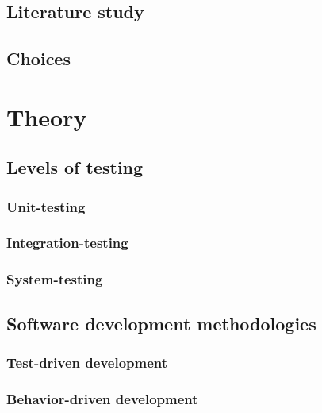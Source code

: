 \documentclass[a4paper]{report}
\begin{document}
  \section{Literature study}
  

  \section{Choices}
  


\chapter{Theory}
\label{chap:theory}

  \section{Levels of testing}

    \subsection{Unit-testing}
    \label{sec:unit_testing}
    

    \subsection{Integration-testing}
    \label{sec:integration_testing}
    

    \subsection{System-testing}
    


  \section{Software development methodologies}
    

    \subsection{Test-driven development}
    \label{sec:tdd}
    

    \subsection{Behavior-driven development}
    
\end{document}

